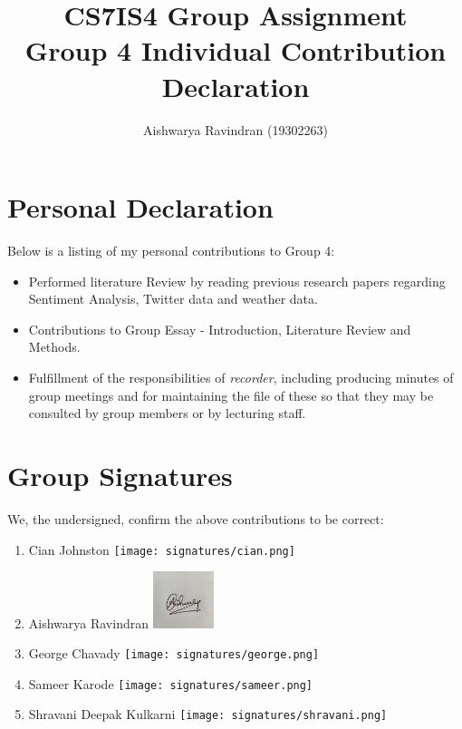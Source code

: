 \documentclass[a4paper,10pt]{article}
\begin{document}
\title{
    CS7IS4 Group Assignment \\
    \large Group 4 Individual Contribution Declaration
}
\author{
    Aishwarya Ravindran (19302263)
}

\maketitle

\section{Personal Declaration}

Below is a listing of my personal contributions to Group 4:

\begin{itemize}
    \item{
        Performed literature Review by reading previous research papers regarding Sentiment Analysis, Twitter data and weather data.
    }
    
    \item{
        Contributions to Group Essay - Introduction, Literature Review and Methods.
    }
    \item{
        Fulfillment of the responsibilities of \textit{recorder}, including producing minutes of group meetings and for maintaining the file of these so that they may be consulted by group members or by lecturing staff. 
    }
\end{itemize}

\section{Group Signatures}

We, the undersigned, confirm the above contributions to be correct:

\begin{enumerate}
    \item{
        Cian Johnston \texttt{[image: signatures/cian.png]}
    }
    \item{
        Aishwarya Ravindran \includegraphics[width=0.7in]{signatures/Aishwarya.jpeg}
    }
    \item{
        George Chavady \texttt{[image: signatures/george.png]}
    }
    \item{
        Sameer Karode \texttt{[image: signatures/sameer.png]}
    }
    \item{
        Shravani Deepak Kulkarni \texttt{[image: signatures/shravani.png]}
    }

\end{enumerate}
\end{document}
